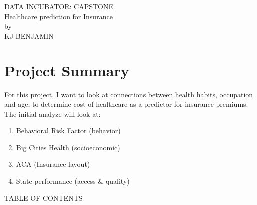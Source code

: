 \documentclass[12pt]{report}
\begin{document}
\begin{titlepage}
  \vspace*{\fill}  
  \begin{center}    
    \huge\MakeUppercase{Data Incubator: Capstone}\\
    \Large Healthcare prediction for Insurance\\
    by\\
    \huge\MakeUppercase{KJ Benjamin}\\
    \vspace{4em}    
  \end{center}
  \vspace*{\fill}  
\end{titlepage}
\pagebreak{}

\chapter*{Project Summary}

\pagestyle{plain} %
\setcounter{page}{2}

\indent For this project, I want to look at connections between health habits, occupation and age, to determine cost of healthcare as a predictor for insurance premiums. The initial analyze will look at:\\
\begin{enumerate}
\item Behavioral Risk Factor (behavior)
\item Big Cities Health (socioeconomic)
\item ACA (Insurance layout)
\item State performance (access \& quality)
\end{enumerate}
\pagebreak{}

{}
\begin{singlespace}
  \renewcommand\contentsname{\normalfont} {\centerline{TABLE OF CONTENTS}}
  \setlength{\cftaftertoctitleskip}{1em}
  \renewcommand{\cftaftertoctitle}{%
    \hfill{\normalfont {Page}\par}}
  \tableofcontents
\end{singlespace}

{}  
\renewcommand{\cftloftitlefont}{\center\normalfont\MakeUppercase}
\renewcommand{\cftafterloftitleskip}{12pt}
\renewcommand{\cftafterloftitle}{%
\\[4em]\mbox{}\hspace{2pt}FIGURES\hfill{\normalfont Page}}
\end{document}
